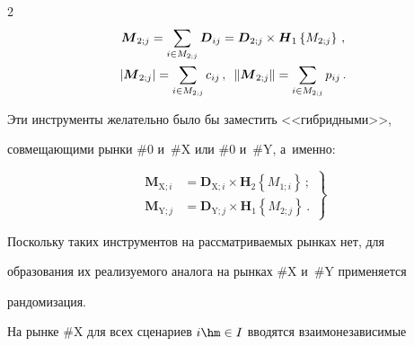 \begin{multicols}{2}
\begin{multline*}


  \boldsymbol{M}_{2;j}= \sum\limits_{i\in 


M_{2;j}}\boldsymbol{D}_{ij}=\boldsymbol{D}_{2;j}\times 


\boldsymbol{H}_1\left\{ M_{2;j}\right\}\,,\\


  \left\vert \boldsymbol{M}_{2;j}\right\vert= \sum\limits_{i\in M_{2;j}} 


c_{ij}\,,\enskip  \left\| \boldsymbol{M}_{2;j}\right\| =


\sum\limits_{i\in M_{2;j}} 


p_{ij}\,.


    \end{multline*}




  Эти инструменты желательно было бы заместить <<гиб\-рид\-ны\-ми>>, 


совмещающими рынки \#0 и~\#X или \#0 и~\#Y, а~именно:


  \begin{equation}


  \left.


  \begin{array}{rl}


  \boldsymbol{M}_{\mathrm{X};i} &= \boldsymbol{D}_{\mathrm{X};i}\times 


\boldsymbol{H}_2\left\{ M_{1;i}\right\}\,;\\[6pt]


  \boldsymbol{M}_{\mathrm{Y};j} &= \boldsymbol{D}_{\mathrm{Y};j}\times 


\boldsymbol{H}_1\left\{ M_{2;j}\right\}\,.


  \end{array}


  \right\}


  \label{e10-ags}


  \end{equation}


  


  Поскольку таких инструментов на рассматриваемых рынках нет, для 


образования их реализуемого аналога на рынках \#X и~\#Y применяется 


рандомизация. 


  


  На рынке \#X для всех сценариев $i\hm\in I$ вводятся взаимонезависимые 



\end{multicols}

